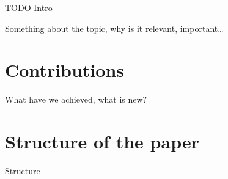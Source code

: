 TODO Intro

Something about the topic, why is it relevant, important\dots

\section{Contributions}
What have we achieved, what is new?

\section{Structure of the paper}
Structure